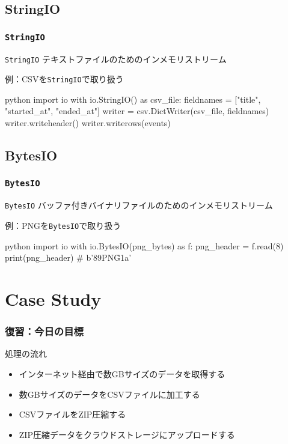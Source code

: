 \documentclass[aspectratio=169,dvipdfmx,14pt,notheorems]{beamer}
\theoremstyle{definition}
\begin{document}
\subsection{StringIO}

\begin{frame}[fragile]\frametitle{\texttt{StringIO}}

\begin{block}{\texttt{StringIO}}
テキストファイルのためのインメモリストリーム
\end{block}

\begin{exampleblock}{例：CSVを\texttt{StringIO}で取り扱う}
\begin{pygments}{python}
import io
with io.StringIO() as csv_file:
    fieldnames = ["title", "started_at", "ended_at"]
    writer = csv.DictWriter(csv_file, fieldnames)
    writer.writeheader()
    writer.writerows(events)
\end{pygments}
\end{exampleblock}

\end{frame}

\subsection{BytesIO}

\begin{frame}[fragile]\frametitle{\texttt{BytesIO}}

\begin{block}{\texttt{BytesIO}}
バッファ付きバイナリファイルのためのインメモリストリーム
\end{block}

\begin{exampleblock}{例：PNGを\texttt{BytesIO}で取り扱う}
\begin{pygments}{python}
import io
with io.BytesIO(png_bytes) as f:
    png_header = f.read(8)
    print(png_header)  # b'\x89PNG\r\n\x1a\n'
\end{pygments}
\end{exampleblock}

\end{frame}

\section{Case Study}

\begin{frame}\frametitle{復習：今日の目標}
\begin{block}{処理の流れ}
\begin{itemize}
\item インターネット経由で数GBサイズのデータを取得する
\item 数GBサイズのデータをCSVファイルに加工する
\item CSVファイルをZIP圧縮する
\item ZIP圧縮データをクラウドストレージにアップロードする
\end{itemize}
\end{block}

\end{frame}
\end{document}
